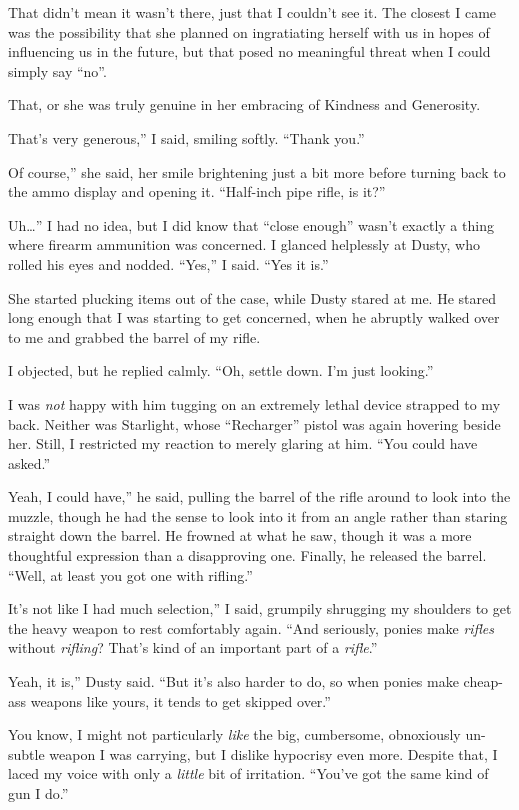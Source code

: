 That didn’t mean it wasn’t there, just that I couldn’t see it. The closest I came was the possibility that she planned on ingratiating herself with us in hopes of influencing us in the future, but that posed no meaningful threat when I could simply say “no”.

That, or she was truly genuine in her embracing of Kindness and Generosity.

\leavevmode{}That’s very generous,” I said, smiling softly. “Thank you.”

\leavevmode{}Of course,” she said, her smile brightening just a bit more before turning back to the ammo display and opening it. “Half-inch pipe rifle, is it?”

\leavevmode{}Uh…” I had no idea, but I did know that “close enough” wasn’t exactly a thing where firearm ammunition was concerned. I glanced helplessly at Dusty, who rolled his eyes and nodded. “Yes,” I said. “Yes it is.”

She started plucking items out of the case, while Dusty stared at me. He stared long enough that I was starting to get concerned, when he abruptly walked over to me and grabbed the barrel of my rifle.

I objected, but he replied calmly. “Oh, settle down. I’m just looking.”

I was \textit{not} happy with him tugging on an extremely lethal device strapped to my back. Neither was Starlight, whose “Recharger” pistol was again hovering beside her. Still, I restricted my reaction to merely glaring at him. “You could have asked.”

\leavevmode{}Yeah, I could have,” he said, pulling the barrel of the rifle around to look into the muzzle, though he had the sense to look into it from an angle rather than staring straight down the barrel. He frowned at what he saw, though it was a more thoughtful expression than a disapproving one. Finally, he released the barrel. “Well, at least you got one with rifling.”

\leavevmode{}It’s not like I had much selection,” I said, grumpily shrugging my shoulders to get the heavy weapon to rest comfortably again. “And seriously, ponies make \textit{rifles} without \textit{rifling}? That’s kind of an important part of a \textit{rifle}.”

\leavevmode{}Yeah, it is,” Dusty said. “But it’s also harder to do, so when ponies make cheap-ass weapons like yours, it tends to get skipped over.”

You know, I might not particularly \textit{like} the big, cumbersome, obnoxiously un-subtle weapon I was carrying, but I dislike hypocrisy even more. Despite that, I laced my voice with only a \textit{little} bit of irritation. “You’ve got the same kind of gun I do.”

